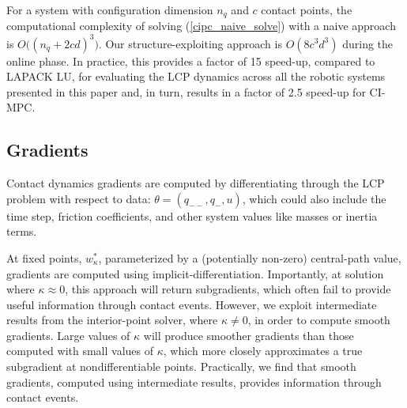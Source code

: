 For a system with configuration dimension $n_q$ and $c$ contact points, the computational complexity of solving (\ref{cipc_naive_solve}) with a naive approach is $O\Big((n_q+2cd)^3 \Big)$. Our structure-exploiting approach is $O(8c^3d^3)$ during the online phase. In practice, this provides a factor of 15 speed-up, compared to LAPACK LU, for evaluating the LCP dynamics across all the robotic systems presented in this paper and, in turn, results in a factor of 2.5 speed-up for CI-MPC.

\subsection{Gradients}
Contact dynamics gradients are computed by differentiating through the LCP problem with respect to data: $\theta = (q_{--}, q_{-}, u)$, which could also include the time step, friction coefficients, and other system values like masses or inertia terms. 

At fixed points, $w^*_{\kappa}$, parameterized by a (potentially non-zero) central-path value, gradients are computed using implicit-differentiation. Importantly, at solution where $\kappa \approx 0$, this approach will return subgradients, which often fail to provide useful information through contact events. However, we exploit intermediate results from the interior-point solver, where $\kappa \neq 0$, in order to compute smooth gradients. Large values of $\kappa$ will produce smoother gradients than those computed with small values of $\kappa$, which more closely approximates a true subgradient at nondifferentiable points. Practically, we find that smooth gradients, computed using intermediate results, provides information through contact events.

